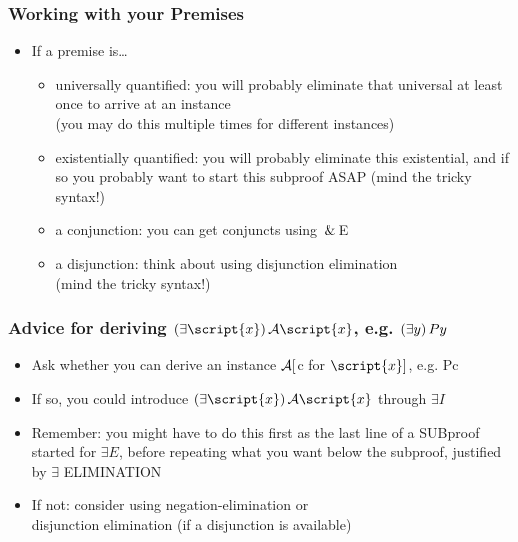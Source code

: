 \begin{frame}
\frametitle{Working with your Premises}

\begin{itemize}[<+->]

\item If a premise is\dots

\begin{itemize}

\item universally quantified: you will probably eliminate that universal at least once to arrive at an instance \\ (you may do this multiple times for different instances)

\item existentially quantified: you will probably eliminate this existential, and if so you probably want to start this subproof ASAP (mind the tricky syntax!)

\item a conjunction: you can get conjuncts using $\,\&\,$E

\item a disjunction: think about using disjunction elimination \\ (mind the tricky syntax!)

\end{itemize}


\end{itemize}
\end{frame}

\begin{frame}
\frametitle{Advice for deriving $\qt{\exists}{\script{x}}\, \metav A\qv{\script{x}}$, e.g. $(\exists y)\, Py$}

\begin{itemize}[<+->]

\item Ask whether you can derive an instance $\mathcal{A}[$c for $\script{x}]$, e.g. Pc

\item If so, you could introduce $\qt{\exists}{\script{x}}\, \metav A\qv{\script{x}}$ through $\exists I$

\bi
\item Remember: you might have to do this first as the last line of a SUBproof started for $\exists E$, before repeating what you want below the subproof, justified by $\exists$ ELIMINATION
\ei

\bigskip

\item If not: consider using negation-elimination or \\ disjunction elimination (if a disjunction is available)


\end{itemize}
\end{frame}

